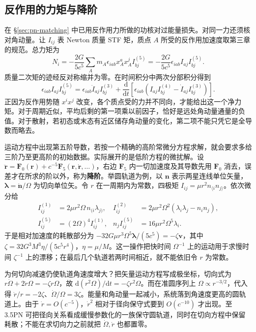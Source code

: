 \subsection{反作用的力矩与降阶}

在 \S\ref{sec:pn-matching} 中已用反作用力所做的功核对过能量损失。对同一力还须核对角动量。让 $I_{ij}$ 表 Newton 质量 STF 矩，质点 $A$ 所受的反作用加速度取第三章的规范。总力矩为
\[
 N_i=-\frac{2G}{5c^5}\sum_A m_A\epsilon_{iab}x_A^a x_A^j I^{(5)}_{bj}
    =-\frac{2G}{5c^5}\epsilon_{iab}I_{aj} I^{(5)}_{bj}.
\]
质量二次矩的迹经反对称缩并为零。在时间积分中两次分部积分得到
\[
 \epsilon_{iab}I_{aj} I^{(5)}_{bj}=
 \epsilon_{iab}\ddot I_{aj}I^{(3)}_{bj}
 +\frac{\mathrm d}{\mathrm dt}\left[
 \epsilon_{iab}(I_{aj}I^{(4)}_{bj}-\dot I_{aj}I^{(3)}_{bj})\right].
\]
正因为反作用势随 $x^ix^j$ 改变，各个质点受的力并不同向，才能给出这一个净力矩。对于周期近似，平均后剩的第一项乘以前因子，恰好是远处角动量通量的负值。对于散射，若初态或末态有近区储存角动量的变化，第二项不能只凭它是全导数而略去。

运动方程中出现第五阶导数，若按一个精确的高阶常微分方程求解，就会要求多给三阶乃至更高阶的初始数据。实际展开的是低阶方程的微扰解。设 $\ddot{\bm r}=\bm F_0(\bm r)+c^{-5}\bm F_5(\bm r,\dot{\bm r},\ldots)$，右边 $\bm F_5$ 内一切加速度及其导数先用 $\bm F_0$ 消去，误差才在所求的阶以外，称为\textbf{降阶}。举圆轨道为例，以 $\bm n$ 表示两星连线单位矢量，$\bm\lambda=\dot{\bm n}/\Omega$ 为切向单位矢。令 $r$ 在一周期内为常数，四极矩 $I_{ij}=\mu r^2 n_{\langle i}n_{j\rangle}$。依次微分给
\begin{align*}
 I_{ij}^{(1)} &=2\mu r^2\Omega\, n_{(i}\lambda_{j)},&
 I_{ij}^{(2)} &=2\mu r^2\Omega^2(\lambda_i\lambda_j-n_i n_j),\\
 I_{ij}^{(5)} &=(2\Omega)^4 I_{ij}^{(1)},&
 n_j I_{ij}^{(5)}&=16\mu r^2\Omega^5\lambda_i .
\end{align*}
于是相对加速度的耗散部分为 $-32G\mu r^3\Omega^5\bm\lambda/(5c^5)=-\zeta\bm v$，其中 $\zeta=32G^3M^3\eta/(5c^5r^4)$，$\eta=\mu/M$。这一操作把快时间 $\Omega^{-1}$ 上的运动用于求慢时间 $\zeta^{-1}$ 上的漂移；在最后几个轨道若两时间相近，就不能依旧令 $r$ 为常数。

为何切向减速仍使轨道角速度增大？把矢量运动方程写成极坐标，切向式为 $r\dot\Omega+2\dot r\Omega=-\zeta r\Omega$，故 $\mathrm d(r^2\Omega)/\mathrm dt=-\zeta r^2\Omega$。而在准圆序列上 $\Omega\propto r^{-3/2}$，代入得 $\dot r/r=-2\zeta$、$\dot\Omega/\Omega=3\zeta$。能量和角动量一起减小，系统落到角速度更高的圆轨道上。由于 $\dot r=O(c^{-5})$，$\dot r^2$ 相对于径向保守式要到 $O(c^{-10})$ 才出现。至 3.5PN 可把径向关系看成缓慢参数化的一族保守圆轨道，同时在切向方程中保留耗散；不能在求切向力之前就把 $\dot\Omega,\dot r$ 也都置零。

